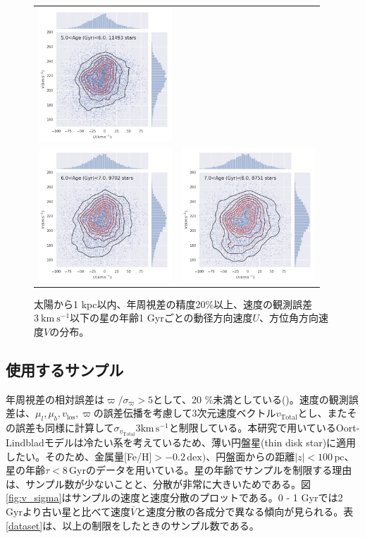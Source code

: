 \begin{figure}[htbp]
\begin{tabular}{cc}
\includegraphics[width=5cm]{fig/UV/5to6Gyr_z0.1kpc_hist2d.png}\\
\includegraphics[width=5cm]{fig/UV/6to7Gyr_z0.1kpc_hist2d.png}&
\includegraphics[width=5cm]{fig/UV/7to8Gyr_z0.1kpc_hist2d.png}\\
\end{tabular}
    \caption{太陽から1 kpc以内、年周視差の精度20\%以上、速度の観測誤差$3\ \mathrm{km\ s^{-1}}$以下の星の年齢1 Gyrごとの動径方向速度$U$、方位角方向速度$V$の分布。}
    \label{hist_UV_1Gyr}
\end{figure}


\subsection{使用するサンプル}
年周視差の相対誤差は$\varpi/\sigma_{\varpi}>5$として、20 $\%$未満としている(\cite{BJ15})。速度の観測誤差は、$\mu_l,\mu_b,v_{\mathrm{los}},\varpi$の誤差伝播を考慮して3次元速度ベクトル$v_{\mathrm{Total}}$とし、またその誤差も同様に計算して$\sigma_{v_{\mathrm{Total}}}3\mathrm{km\,s^{-1}}$と制限している。本研究で用いているOort-Lindbladモデルは冷たい系を考えているため、薄い円盤星(thin disk star)に適用したい。そのため、金属量[Fe/H]$>-0.2\,\mathrm{dex})$、円盤面からの距離$|z|<100\,\mathrm{pc}$、星の年齢$\tau < 8\,\mathrm{Gyr}$のデータを用いている。星の年齢でサンプルを制限する理由は、サンプル数が少ないことと、分散が非常に大きいためである。図\ref{fig:v_sigma}はサンプルの速度と速度分散のプロットである。0 - 1 Gyrでは2 Gyrより古い星と比べて速度$\overline{V}$と速度分散の各成分で異なる傾向が見られる。表\ref{dataset}は、以上の制限をしたときのサンプル数である。

